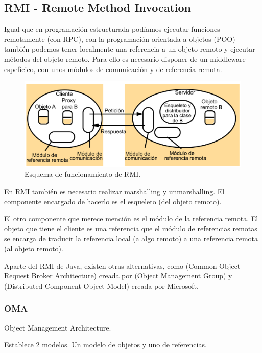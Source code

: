 \subsection{RMI - Remote Method Invocation}

Igual que en programación estructurada podíamos ejecutar funciones remotamente (con RPC), con la programación orientada a objetos (POO) también podemos tener localmente una referencia a un objeto remoto y ejecutar métodos del objeto remoto. Para ello es necesario disponer de un middleware espefícico, con unos módulos de comunicación y de referencia remota.


\begin{figure}[hbtp]
\centering
\includegraphics[width=1\textwidth]{img/RMI.png}
\caption{Esquema de funcionamiento de RMI.}
\label{RMI}
\end{figure}

En RMI también es necesario realizar marshalling y unmarshalling. El componente encargado de hacerlo es el esqueleto (del objeto remoto).

El otro componente que merece mención es el módulo de la referencia remota. El objeto que tiene el cliente es una referencia que el módulo de referencias remotas se encarga de traducir la referencia local (a algo remoto) a una referencia remota (al objeto remoto).

Aparte del RMI de Java, existen otras alternativas, como  (Common Object Request Broker Architecture) creada por  (Object Management Group) y  (Distributed Component Object Model) creada por Microsoft.

\subsubsection{OMA}
\begin{defn}[OMA]
Object Management Architecture.

Establece 2 modelos. Un modelo de objetos y uno de referencias.
\end{defn}


